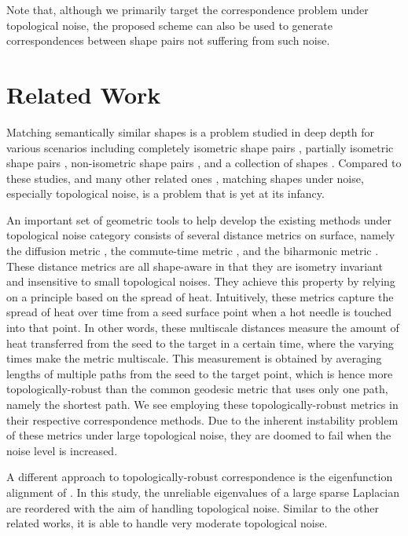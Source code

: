 \documentclass{egpubl}
\begin{document}
Note that, although we primarily target the correspondence problem under topological noise, the proposed scheme can also be used to generate correspondences between shape pairs not suffering from such noise. 

\section{Related Work}
\label{related}

Matching semantically similar shapes is a problem studied in deep depth for various scenarios including completely isometric shape pairs \cite{Ovsjanikov10}\cite{Sahillioglu12b}, partially isometric shape pairs \cite{Sahillioglu13}\cite{Litany16}, non-isometric shape pairs \cite{Panozzo13}\cite{Solomon16}, and a collection of shapes \cite{Cosmo16}\cite{Sahillioglu14}. Compared to these studies, and many other related ones \cite{Kaick11}, matching shapes under noise, especially topological noise, is a problem that is yet at its infancy.

An important set of geometric tools to help develop the existing methods under topological noise category consists of several distance metrics on surface, namely the diffusion metric \cite{Coifman05}, the commute-time metric \cite{Wang11}, and the biharmonic metric \cite{Rustamov10}. These distance metrics are all shape-aware in that they are isometry invariant and insensitive to small topological noises. They achieve this property by relying on a principle based on the spread of heat. Intuitively, these metrics capture the spread of heat over time from a seed surface point when a hot needle is touched into that point. In other words, these multiscale distances measure the amount of heat transferred from the seed to the target in a certain time, where the varying times make the metric multiscale. This measurement is obtained by averaging lengths of multiple paths from the seed to the target point, which is hence more topologically-robust than the common geodesic metric that uses only one path, namely the shortest path. We see \cite{Bronstein10}\cite{Sharma10}\cite{Sharma11} employing these topologically-robust metrics in their respective correspondence methods. Due to the inherent instability problem of these metrics under large topological noise, they are doomed to fail when the noise level is increased.

A different approach to topologically-robust correspondence is the eigenfunction alignment of \cite{Mateus08}. In this study, the unreliable eigenvalues of a large sparse Laplacian are reordered with the aim of handling topological noise. Similar to the other related works, it is able to handle very moderate topological noise.
\end{document}
